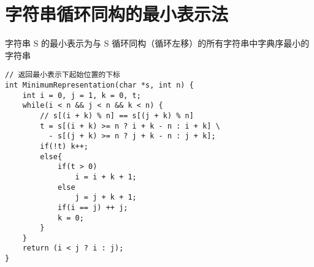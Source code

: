\section{字符串循环同构的最小表示法}
\par \noindent 字符串 S 的最小表示为与 S 循环同构（循环左移）的所有字符串中字典序最小的字符串
\begin{verbatim}
// 返回最小表示下起始位置的下标
int MinimumRepresentation(char *s, int n) {  
    int i = 0, j = 1, k = 0, t;  
    while(i < n && j < n && k < n) {  
        // s[(i + k) % n] == s[(j + k) % n]
        t = s[(i + k) >= n ? i + k - n : i + k] \
          - s[(j + k) >= n ? j + k - n : j + k];  
        if(!t) k++;  
        else{  
            if(t > 0) 
                i = i + k + 1;  
            else 
                j = j + k + 1;  
            if(i == j) ++ j;  
            k = 0;  
        }  
    }  
    return (i < j ? i : j);  
}  
\end{verbatim}